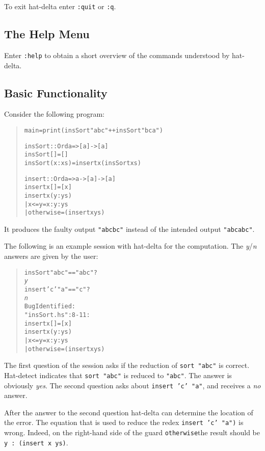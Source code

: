 \documentclass[12pt]{article}
\begin{document}
To exit hat-delta enter \texttt{:quit} or \texttt{:q}.

\subsection{The Help Menu}

Enter \texttt{:help} to obtain a short overview of the commands
understood by hat-delta.

\subsection{Basic Functionality}

Consider the following program:
\begin{quote}
\begin{alltt}
main = print (insSort "abc" ++ insSort "bca")

insSort :: Ord a => [a] -> [a]
insSort [] = []
insSort (x:xs) = insert x (insSort xs)

insert :: Ord a => a -> [a] -> [a]
insert x [] = [x]
insert x (y:ys)
  | x <= y    = x:y:ys
  | otherwise = (insert x ys)
\end{alltt}
\end{quote}

It produces the faulty output \texttt{"abcbc"} instead of the intended
output \texttt{"abcabc"}.

The following is an example session with hat-delta for the
computation. The \emph{y}/\emph{n} answers are given by the user:

\begin{quote}
\begin{alltt}
insSort "abc" == "abc"?
\emph{y}
insert 'c' "a" == "c"?
\emph{n}
Bug Identified:
  "insSort.hs":8-11:
  insert x [] = [x]
  insert x (y:ys)
    | x <= y    = x:y:ys
    | otherwise = (insert x ys)
\end{alltt}
\end{quote}

The first question of the session asks if the reduction of \texttt{sort "abc"}
is correct. Hat-detect indicates that \texttt{sort "abc"} is reduced to
\texttt{"abc"}. The answer is obviously \emph{yes}.  The second question asks about \texttt{insert 'c' "a"}, and receives a \emph{no} answer.

After the answer to the second question hat-delta can determine
the location of the error.  The equation that is used to reduce
the redex \texttt{insert 'c' "a")} is wrong. Indeed, on the right-hand
side of the guard \texttt{otherwise}the result
should be \texttt{y~:~(insert~x~ys)}.
\end{document}

